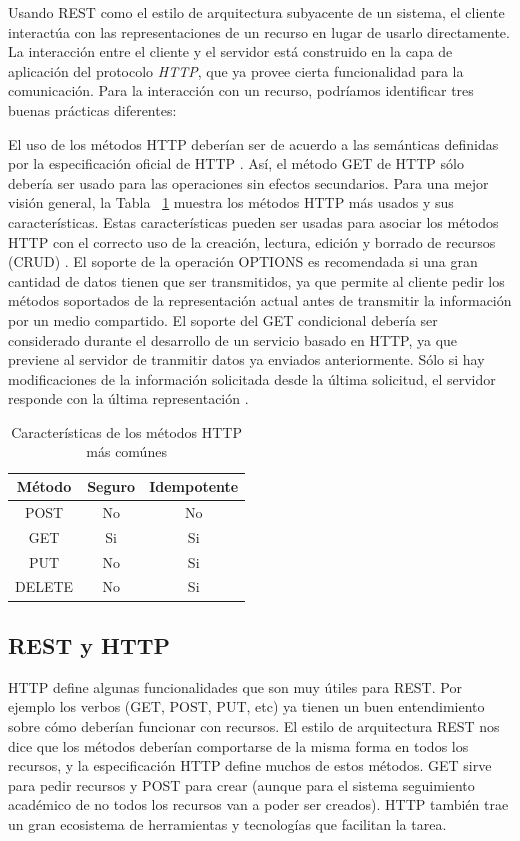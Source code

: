 Usando REST como el estilo de arquitectura subyacente de un sistema, el cliente interactúa con las representaciones de un recurso en lugar de usarlo directamente. La interacción entre el cliente y el servidor está construido en la capa de aplicación del protocolo \textit{HTTP}, que ya provee cierta funcionalidad para la comunicación. Para la interacción con un recurso, podríamos identificar tres buenas prácticas diferentes:
\begin{outline}
    \1 El uso de los métodos HTTP deberían ser de acuerdo a las semánticas definidas por la especificación oficial de HTTP \cite{WAPID}. Así, el método GET de HTTP sólo debería ser usado para las operaciones sin efectos secundarios. Para una mejor visión general, la Tabla ~\ref{tab:tabla_http} muestra los métodos HTTP más usados y sus características. Estas características pueden ser usadas para asociar los métodos HTTP con el correcto uso de la creación, lectura, edición y borrado de recursos (CRUD) \cite{RVINOSKI}.
    \1 El soporte de la operación OPTIONS es recomendada si una gran cantidad de datos tienen que ser transmitidos, ya que permite al cliente pedir los métodos soportados de la representación actual antes de transmitir la información por un medio compartido. 
    \1 El soporte del GET condicional debería ser considerado durante el desarrollo de un servicio basado en HTTP, ya que previene al servidor de tranmitir datos ya enviados anteriormente. Sólo si hay modificaciones de la información solicitada desde la última solicitud, el servidor responde con la última representación  \cite{RVINOSKI}.
\end{outline}

\begin{table}[!htbp]
    \centering
    \makegapedcells
    \begin{tabular}{|c|c|c|}
    \hline
    Método & Seguro & Idempotente \\ \hline
    POST & No & No \\ \hline
    GET & Si & Si \\ \hline
    PUT & No & Si \\ \hline
    DELETE & No & Si \\ \hline
    
    \end{tabular}
    \caption{Características de los métodos HTTP más comúnes}
    \label{tab:tabla_http}
\end{table}

\subsection[REST y HTTP]{REST y HTTP}
HTTP define algunas funcionalidades que son muy útiles para REST. Por ejemplo los verbos (GET, POST, PUT, etc) ya tienen un buen entendimiento sobre cómo deberían funcionar con recursos. El estilo de arquitectura REST nos dice que los métodos deberían comportarse de la misma forma en todos los recursos, y la especificación HTTP define muchos de estos métodos. 
GET sirve para pedir recursos y POST para crear (aunque para el sistema seguimiento académico de no todos los recursos van a poder ser creados).
HTTP también trae un gran ecosistema de herramientas y tecnologías que facilitan la tarea. 


